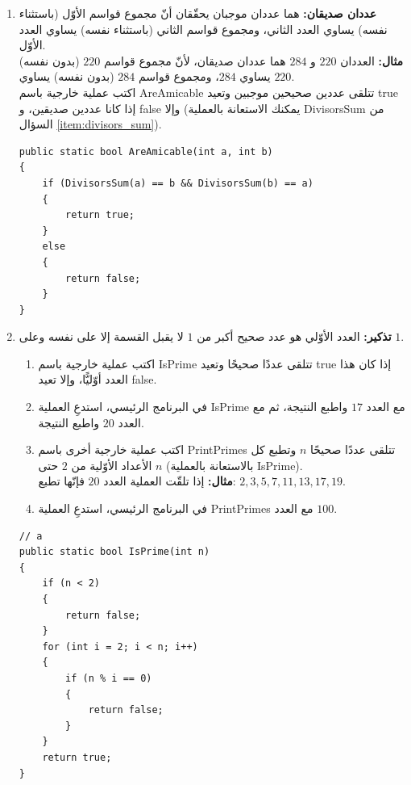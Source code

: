 \documentclass[14pt]{extarticle}
\begin{document}
\begin{enumerate}[resume, itemsep=2em]
\item \textbf{عددان صديقان:} هما عددان موجبان يحقّقان أنّ مجموع قواسم الأوّل (باستثناء نفسه) يساوي العدد الثاني، ومجموع قواسم الثاني (باستثناء نفسه) يساوي العدد الأوّل. \\
\textbf{مثال:} العددان $220$ و $284$ هما عددان صديقان، لأنّ مجموع قواسم $220$ (بدون نفسه) يساوي $284$، ومجموع قواسم $284$ (بدون نفسه) يساوي $220$. \\
اكتب عملية خارجية باسم \textenglish{AreAmicable} تتلقى عددين صحيحين موجبين وتعيد \textenglish{true} إذا كانا عددين صديقين، و \textenglish{false} وإلا (يمكنك الاستعانة بالعملية \textenglish{DivisorsSum} من السؤال \ref{item:divisors_sum}).
\ifwithsols
\begin{boxSolution}
\begin{english}
\begin{verbatim}
public static bool AreAmicable(int a, int b)
{
    if (DivisorsSum(a) == b && DivisorsSum(b) == a)
    {
        return true;
    }
    else
    {
        return false;
    }
}
\end{verbatim}
\end{english}
\end{boxSolution}
\fi
\filbreak

\item \textbf{تذكير:} العدد الأوّلي هو عدد صحيح أكبر من $1$ لا يقبل القسمة إلا على نفسه وعلى $1$.
\begin{enumerate}
    \item اكتب عملية خارجية باسم \textenglish{IsPrime} تتلقى عددًا صحيحًا وتعيد \textenglish{true} إذا كان هذا العدد أوّليًّا، وإلا تعيد \textenglish{false}.
    \item في البرنامج الرئيسي، استدعِ العملية \textenglish{IsPrime} مع العدد $17$ واطبع النتيجة، ثم مع العدد $20$ واطبع النتيجة.
    \item اكتب عملية خارجية أخرى باسم \textenglish{PrintPrimes} تتلقى عددًا صحيحًا $n$ وتطبع كل الأعداد الأوّلية من $2$ حتى $n$ (بالاستعانة بالعملية \textenglish{IsPrime}). \\
    \textbf{مثال:} إذا تلقّت العملية العدد $20$ فإنّها تطبع: $2, 3, 5, 7, 11, 13, 17, 19$.
    \item في البرنامج الرئيسي، استدعِ العملية \textenglish{PrintPrimes} مع العدد $100$.
\end{enumerate}
\ifwithsols
\begin{boxSolution}[فرع أ و ج]
\begin{english}
\begin{verbatim}
// a
public static bool IsPrime(int n)
{
    if (n < 2)
    {
        return false;
    }
    for (int i = 2; i < n; i++)
    {
        if (n % i == 0)
        {
            return false;
        }
    }
    return true;
}


\end{verbatim}
\end{english}
\end{boxSolution}
\end{enumerate}
\end{document}
